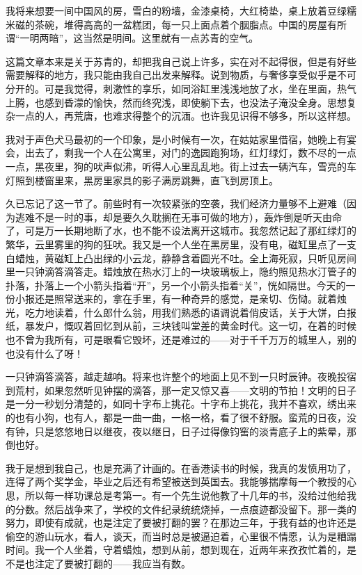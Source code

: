 \par 我将来想要一间中国风的房，雪白的粉墙，金漆桌椅，大红椅垫，桌上放着豆绿糯米磁的茶碗，堆得高高的一盆糕团，每一只上面点着个胭脂点。中国的房屋有所谓“一明两暗”，这当然是明间。这里就有一点苏青的空气。
\par 这篇文章本来是关于苏青的，却把我自己说上许多，实在对不起得很，但是有好些需要解释的地方，我只能由我自己出发来解释。说到物质，与奢侈享受似乎是不可分开的。可是我觉得，刺激性的享乐，如同浴缸里浅浅地放了水，坐在里面，热气上腾，也感到昏濛的愉快，然而终究浅，即使躺下去，也没法子淹没全身。思想复杂一点的人，再荒唐，也难求得整个的沉湎。也许我见识得不够多，所以这样想。
\par 我对于声色犬马最初的一个印象，是小时候有一次，在姑姑家里借宿，她晚上有宴会，出去了，剩我一个人在公寓里，对门的逸园跑狗场，红灯绿灯，数不尽的一点一点，黑夜里，狗的吠声似沸，听得人心里乱乱地。街上过去一辆汽车，雪亮的车灯照到楼窗里来，黑房里家具的影子满房跳舞，直飞到房顶上。
\par 久已忘记了这一节了。前些时有一次较紧张的空袭，我们经济力量够不上避难（因为逃难不是一时的事，却是要久久耽搁在无事可做的地方），轰炸倒是听天由命了，可是万一长期地断了水，也不能不设法离开这城市。我忽然记起了那红绿灯的繁华，云里雾里的狗的狂吠。我又是一个人坐在黑房里，没有电，磁缸里点了一支白蜡烛，黄磁缸上凸出绿的小云龙，静静含着圆光不吐。全上海死寂，只听见房间里一只钟滴答滴答走。蜡烛放在热水汀上的一块玻璃板上，隐约照见热水汀管子的扑落，扑落上一个小箭头指着“开”，另一个小箭头指着“关”，恍如隔世。今天的一份小报还是照常送来的，拿在手里，有一种奇异的感觉，是亲切、伤恸。就着烛光，吃力地读着，什么郎什么翁，用我们熟悉的语调说着俏皮话，关于大饼，白报纸，暴发户，慨叹着回忆到从前，三块钱叫堂差的黄金时代。这一切，在着的时候也不曾为我所有，可是眼看它毁坏，还是难过的——对于千千万万的城里人，别的也没有什么了呀！
\par 一只钟滴答滴答，越走越响。将来也许整个的地面上见不到一只时辰钟。夜晚投宿到荒村，如果忽然听见钟摆的滴答，那一定又惊又喜——文明的节拍！文明的日子是一分一秒划分清楚的，如同十字布上挑花。十字布上挑花，我并不喜欢，绣出来的也有小狗，也有人，都是一曲一曲，一格一格，看了很不舒服。蛮荒的日夜，没有钟，只是悠悠地日以继夜，夜以继日，日子过得像钧窖的淡青底子上的紫晕，那倒也好。
\par 我于是想到我自己，也是充满了计画的。在香港读书的时候，我真的发愤用功了，连得了两个奖学金，毕业之后还有希望被送到英国去。我能够揣摩每一个教授的心思，所以每一样功课总是考第一。有一个先生说他教了十几年的书，没给过他给我的分数。然后战争来了，学校的文件纪录统统烧掉，一点痕迹都没留下。那一类的努力，即使有成就，也是注定了要被打翻的罢？在那边三年，于我有益的也许还是偷空的游山玩水，看人，谈天，而当时总是被逼迫着，心里很不情愿，认为是糟蹋时间。我一个人坐着，守着蜡烛，想到从前，想到现在，近两年来孜孜忙着的，是不是也注定了要被打翻的——我应当有数。
